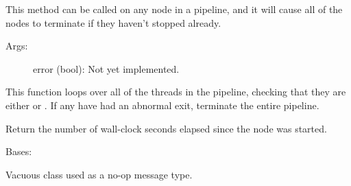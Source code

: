 \documentclass[letterpaper,10pt,english]{sphinxmanual}
\begin{document}
\begin{fulllineitems}
\begin{fulllineitems}
\end{fulllineitems}


\begin{fulllineitems}
\label{\detokenize{api:nanostream.node.NanoNode.terminate_pipeline}}
This method can be called on any node in a pipeline, and it will cause
all of the nodes to terminate if they haven’t stopped already.
\begin{description}
\item[{Args:}] \leavevmode
error (bool): Not yet implemented.

\end{description}

\end{fulllineitems}


\begin{fulllineitems}
\label{\detokenize{api:nanostream.node.NanoNode.thread_monitor}}
This function loops over all of the threads in the pipeline, checking
that they are either  or . If any have had an
abnormal exit, terminate the entire pipeline.

\end{fulllineitems}


\begin{fulllineitems}
\label{\detokenize{api:nanostream.node.NanoNode.time_running}}
Return the number of wall-clock seconds elapsed since the node was
started.

\end{fulllineitems}


\end{fulllineitems}


\begin{fulllineitems}
\label{\detokenize{api:nanostream.node.NothingToSeeHere}}
Bases: 

Vacuous class used as a no-op message type.

\end{fulllineitems}
\end{document}
